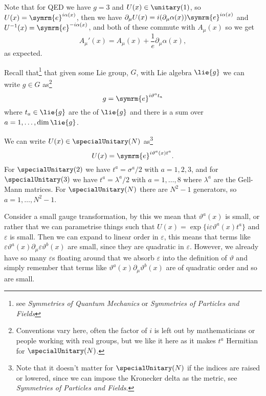 \documentclass[fleqn]{NotesClass}
\newcommand*{\course}[1]{\textit{#1}}
\newcommand{\e}{\symrm{e}}
\begin{document}
    Note that for QED we have \(g = 3\) and \(U(x) \in \unitary(1)\), so \(U(x) = \e^{i\alpha(x)}\), then we have \(\partial_\mu U(x) = i(\partial_\mu\alpha(x))\e^{i\alpha(x)}\) and \(U^{-1}(x) = \e^{-i\alpha(x)}\), and both of these commute with \(A_\mu(x)\) so we get
    \begin{equation}
        A_\mu'(x) = A_\mu(x) + \frac{1}{e}\partial_\mu \alpha(x),
    \end{equation}
    as expected.
    
    Recall that\footnote{see \course{Symmetries of Quantum Mechanics} or \course{Symmetries of Particles and Fields}} that given some Lie group, \(G\), with Lie algebra \(\lie{g}\) we can write \(g \in G\) as\footnote{Conventions vary here, often the factor of \(i\) is left out by mathematicians or people working with real groups, but we like it here as it makes \(t^a\) Hermitian for \(\specialUnitary(N)\).}
    \begin{equation}
        g = \e^{i\vartheta^at_a}
    \end{equation}
    where \(t_a \in \lie{g}\) are the  of \(\lie{g}\) and there is a sum over \(a = 1, \dotsc, \dim \lie{g}\).
    
    We can write \(U(x) \in \specialUnitary(N)\) as\footnote{Note that it doesn't matter for \(\specialUnitary(N)\) if the indices are raised or lowered, since we can impose the Kronecker delta as the metric, see \course{Symmetries of Particles and Fields}.}
    \begin{equation}
        U(x) = \e^{i\vartheta^a(x)t^a}.
    \end{equation}
    For \(\specialUnitary(2)\) we have \(t^a = \sigma^a/2\) with \(a = 1, 2, 3\), and for \(\specialUnitary(3)\) we have \(t^a = \lambda^a/2\) with \(a = 1, \dotsc, 8\) where \(\lambda^a\) are the Gell-Mann matrices.
    For \(\specialUnitary(N)\) there are \(N^2 - 1\) generators, so \(a = 1, \dotsc, N^2 - 1\).
    
    Consider a small gauge transformation, by this we mean that \(\vartheta^a(x)\) is small, or rather that we can parametrise things such that \(U(x) = \exp\{i\varepsilon\vartheta^a(x)t^a\}\) and \(\varepsilon\) is small.
    Then we can expand to linear order in \(\varepsilon\), this means that terms like \(\varepsilon\vartheta^a(x)\partial_\mu \varepsilon\vartheta^b(x)\) are small, since they are quadratic in \(\varepsilon\).
    However, we already have so many \(\varepsilon\)s floating around that we absorb \(\varepsilon\) into the definition of \(\vartheta\) and simply remember that terms like \(\vartheta^a(x)\partial_\mu\vartheta^b(x)\) are of quadratic order and so are small.
    
\end{document}
